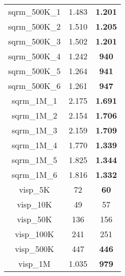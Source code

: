 \begin{tabular}{cc||c}
sqrm\_500K\_1      & 1.483            & {\bf 1.201}     \\ 
sqrm\_500K\_2      & 1.510            & {\bf 1.205}     \\ 
sqrm\_500K\_3      & 1.502            & {\bf 1.201}     \\ 
sqrm\_500K\_4      & 1.242            & {\bf 940}       \\ 
sqrm\_500K\_5      & 1.264            & {\bf 941}       \\ 
sqrm\_500K\_6      & 1.261            & {\bf 947}       \\ 
sqrm\_1M\_1        & 2.175            & {\bf 1.691}     \\ 
sqrm\_1M\_2        & 2.154            & {\bf 1.706}     \\ 
sqrm\_1M\_3        & 2.159            & {\bf 1.709}     \\ 
sqrm\_1M\_4        & 1.770            & {\bf 1.339}     \\ 
sqrm\_1M\_5        & 1.825            & {\bf 1.344}     \\ 
sqrm\_1M\_6        & 1.816            & {\bf 1.332}     \\ 
visp\_5K          & 72               & {\bf 60}        \\ 
visp\_10K         & 49               & 57              \\ 
visp\_50K         & 136              & 156             \\ 
visp\_100K        & 241              & 251             \\ 
visp\_500K        & 447              & {\bf 446}       \\ 
visp\_1M          & 1.035            & {\bf 979}       \\ 
\end{tabular}